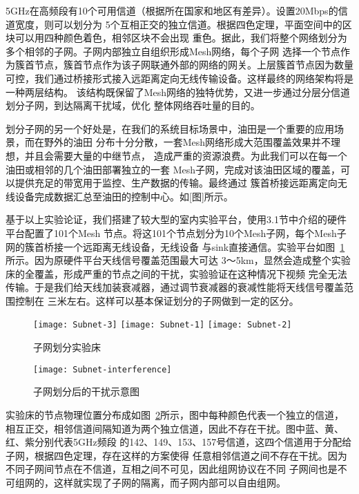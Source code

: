 5GHz在高频段有10个可用信道（根据所在国家和地区有差异）。设置20Mbps的信道宽度，则可以划分为
5个互相正交的独立信道。根据四色定理，平面空间中的区块可以用四种颜色着色，相邻区块不会出现
重色。据此，我们将整个网络划分为多个相邻的子网。子网内部独立自组织形成Mesh网络，每个子网
选择一个节点作为簇首节点，簇首节点作为该子网联通外部的网络的网关。上层簇首节点因为数量
可控，我们通过桥接形式接入远距离定向无线传输设备。这样最终的网络架构将是一种两层结构。
该结构既保留了Mesh网络的独特优势，又进一步通过分层分信道划分子网，到达隔离干扰域，优化
整体网络吞吐量的目的。

划分子网的另一个好处是，在我们的系统目标场景中，油田是一个重要的应用场景，而在野外的油田
分布十分分散，一套Mesh网络形成大范围覆盖效果并不理想，并且会需要大量的中继节点，
造成严重的资源浪费。为此我们可以在每一个油田或相邻的几个油田部署独立的一套
Mesh子网，完成对该油田区域的覆盖，可以提供充足的带宽用于监控、生产数据的传输。最终通过
簇首桥接远距离定向无线设备完成数据汇总至油田的控制中心。如[图]所示。

基于以上实验论证，我们搭建了较大型的室内实验平台，使用3.1节中介绍的硬件平台配置了101个Mesh
节点。将这101个节点划分为10个Mesh子网，每个Mesh子网的簇首桥接一个远距离无线设备，无线设备
与sink直接通信。实验平台如图~\ref{fig:subnet}所示。因为原硬件平台天线信号覆盖范围最大可达
3～5km，显然会造成整个实验床的全覆盖，形成严重的节点之间的干扰，实验验证在这种情况下视频
完全无法传输。于是我们给天线加装衰减器，通过调节衰减器的衰减性能将天线信号覆盖范围控制在
三米左右。这样可以基本保证划分的子网做到一定的区分。

\begin{figure}[h]
  \centering
  \subcaptionbox{}
      {\texttt{[image: Subnet-3]}}
  \hspace{1em}
  \subcaptionbox{}
    {\texttt{[image: Subnet-1]}}
  \hspace{1em}
  \subcaptionbox{}
    {\texttt{[image: Subnet-2]}}
  \caption{子网划分实验床}
  \label{fig:subnet}
\end{figure}

\begin{figure}[H] %
  \centering
  \texttt{[image: Subnet-interference]}
  \caption{子网划分后的干扰示意图}
  \label{fig:subnet_interference}
\end{figure}
实验床的节点物理位置分布成如图~\ref{fig:subnet_interference}所示，图中每种颜色代表一个独立的信道，
相互正交，相邻信道间隔知道为两个独立信道，因此不存在干扰。图中蓝、黄、红、紫分别代表5GHz频段
的142、149、153、157号信道，这四个信道用于分配给子网，根据四色定理，存在这样的方案使得
任意相邻信道之间不存在干扰。因为不同子网间节点在不信道，互相之间不可见，因此组网协议在不同
子网间也是不可组网的，这样就实现了子网的隔离，而子网内部可以自由组网。

